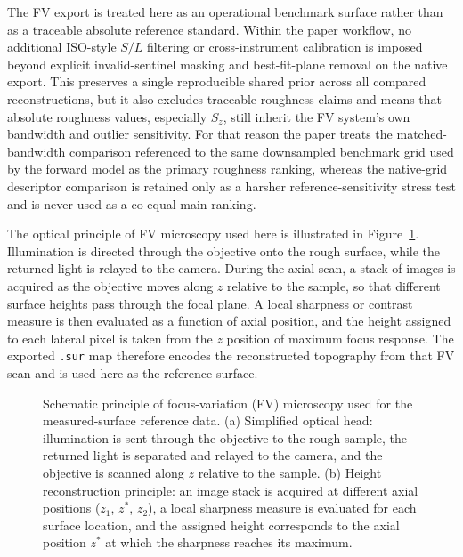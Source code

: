 \documentclass[photonics,article,submit,pdftex,moreauthors]{Definitions/mdpi}
\begin{document}



The FV export is treated here as an operational benchmark surface rather than as a traceable absolute reference standard. Within the paper workflow, no additional ISO-style $S/L$ filtering or cross-instrument calibration is imposed beyond explicit invalid-sentinel masking and best-fit-plane removal on the native export. This preserves a single reproducible shared prior across all compared reconstructions, but it also excludes traceable roughness claims and means that absolute roughness values, especially $S_z$, still inherit the FV system's own bandwidth and outlier sensitivity. For that reason the paper treats the matched-bandwidth comparison referenced to the same downsampled benchmark grid used by the forward model as the primary roughness ranking, whereas the native-grid descriptor comparison is retained only as a harsher reference-sensitivity stress test and is never used as a co-equal main ranking.

The optical principle of FV microscopy used here is illustrated in Figure~\ref{fig:fv_principle}. Illumination is directed through the objective onto the rough surface, while the returned light is relayed to the camera. During the axial scan, a stack of images is acquired as the objective moves along $z$ relative to the sample, so that different surface heights pass through the focal plane. A local sharpness or contrast measure is then evaluated as a function of axial position, and the height assigned to each lateral pixel is taken from the $z$ position of maximum focus response. The exported \texttt{.sur} map therefore encodes the reconstructed topography from that FV scan and is used here as the reference surface.

\begin{figure}[t]
\centering

\caption{Schematic principle of focus-variation (FV) microscopy used for the measured-surface reference data. (a) Simplified optical head: illumination is sent through the objective to the rough sample, the returned light is separated and relayed to the camera, and the objective is scanned along $z$ relative to the sample. (b) Height reconstruction principle: an image stack is acquired at different axial positions ($z_1$, $z^*$, $z_2$), a local sharpness measure is evaluated for each surface location, and the assigned height corresponds to the axial position $z^*$ at which the sharpness reaches its maximum.}
\label{fig:fv_principle}
\end{figure}
\unskip
\end{document}
